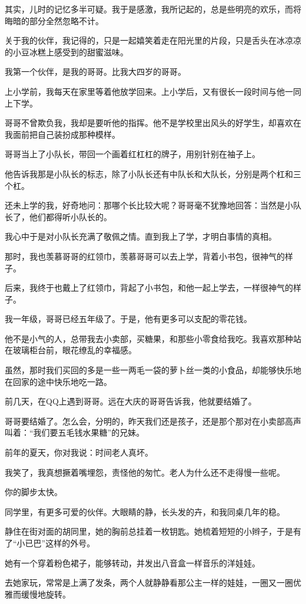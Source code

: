 
		其实，儿时的记忆多半可疑。我于是感激，我所记起的，总是些明亮的欢乐，而将晦暗的部分全然忽略不计。\par
		关于我的伙伴，我记得的，只是一起嬉笑着走在阳光里的片段，只是舌头在冰凉凉的小豆冰糕上感受到的甜蜜滋味。

		我第一个伙伴，是我的哥哥。比我大四岁的哥哥。\par
		上小学前，我每天在家里等着他放学回来。上小学后，又有很长一段时间与他一同上下学。\par
		哥哥不曾欺负我，我却是要听他的指挥。他不是学校里出风头的好学生，却喜欢在我面前把自己装扮成那种模样。\par
		哥哥当上了小队长，带回一个画着红杠杠的牌子，用别针别在袖子上。\par
		他告诉我那是小队长的标志，除了小队长还有中队长和大队长，分别是两个杠和三个杠。\par
		还未上学的我，好奇地问：那哪个长比较大呢？哥哥毫不犹豫地回答：当然是小队长了，他们都得听小队长的。\par
		我心中于是对小队长充满了敬佩之情。直到我上了学，才明白事情的真相。

		那时，我也羡慕哥哥的红领巾，羡慕哥哥可以去上学，背着小书包，很神气的样子。\par
		后来，我终于也戴上了红领巾，背起了小书包，和他一起上学去，一样很神气的样子。

		我一年级，哥哥已经五年级了。于是，他有更多可以支配的零花钱。\par
		他不是小气的人，总带我去小卖部，买糖果，和那些小零食给我吃。我喜欢那种站在玻璃柜台前，眼花缭乱的幸福感。\par
		虽然，那时我们买回的多是一些一两毛一袋的萝卜丝一类的小食品，却能够快乐地在回家的途中快乐地吃一路。

		前几天，在QQ上遇到哥哥。远在大庆的哥哥告诉我，他就要结婚了。\par
		哥哥要结婚了。怎么会，分明的，昨天我们还是孩子，还是那个那对在小卖部高声叫着：“我们要五毛钱水果糖”的兄妹。\par
		前年的夏天，你对我说：时间老人真坏。\par
		我笑了，我真想撅着嘴埋怨，责怪他的匆忙。老人为什么还不走得慢一些呢。\par
		你的脚步太快。

		同学里，有更多可爱的伙伴。大眼睛的静，长头发的卉，和我同桌几年的稳。

		静住在街对面的胡同里，她的胸前总挂着一枚钥匙。她梳着短短的小辫子，于是有了“小已巴”这样的外号。\par
		她有一个穿着粉色裙子，能够转动，并发出八音盒一样音乐的洋娃娃。\par
		去她家玩，常常是上满了发条，两个人就静静看那公主一样的娃娃，一圈又一圈优雅而缓慢地旋转。

